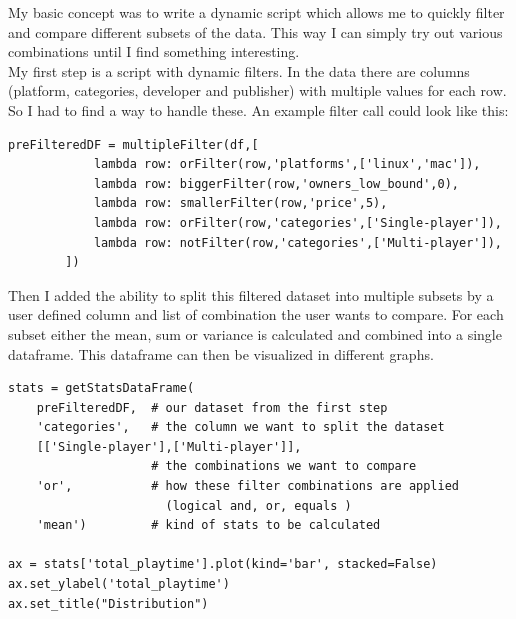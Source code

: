 \documentclass[11pt]{article}
\begin{document}
My basic concept was to write a dynamic script which allows me to quickly filter and compare different subsets of the data. This way I can simply try out various combinations until I find something interesting.\\
My first step is a script with dynamic filters. In the data there are columns (platform, categories, developer and publisher) with multiple values for each row. So I had to find a way to handle these. An example filter call could look like this:\\
\begin{minipage}{\linewidth}
\begin{lstlisting}
preFilteredDF = multipleFilter(df,[
            lambda row: orFilter(row,'platforms',['linux','mac']),
            lambda row: biggerFilter(row,'owners_low_bound',0),
            lambda row: smallerFilter(row,'price',5),
            lambda row: orFilter(row,'categories',['Single-player']),
            lambda row: notFilter(row,'categories',['Multi-player']),
        ])
\end{lstlisting}
\end{minipage}

Then I added the ability to split this filtered dataset into multiple subsets by a user defined column and list of combination the user wants to compare. For each subset either the mean, sum or variance is calculated and combined into a single dataframe. This dataframe can then be visualized in different graphs.

\begin{minipage}{\linewidth}
    \begin{lstlisting}
stats = getStatsDataFrame(
    preFilteredDF,  # our dataset from the first step
    'categories',   # the column we want to split the dataset
    [['Single-player'],['Multi-player']],
                    # the combinations we want to compare
    'or',           # how these filter combinations are applied 
                      (logical and, or, equals )
    'mean')         # kind of stats to be calculated

ax = stats['total_playtime'].plot(kind='bar', stacked=False)
ax.set_ylabel('total_playtime')
ax.set_title("Distribution")
    \end{lstlisting}
\end{minipage}
\end{document}
